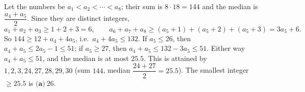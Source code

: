 Let the numbers be $a_1<a_2<\cdots<a_8$; their sum is $8\cdot18=144$ and the median is $\dfrac{a_4+a_5}{2}$. Since they are distinct integers,
\[
a_1+a_2+a_3\ge1+2+3=6,\qquad a_6+a_7+a_8\ge(a_5+1)+(a_5+2)+(a_5+3)=3a_5+6 .
\]
So $144\ge12+a_4+4a_5$, i.e.\ $a_4+4a_5\le132$. If $a_5\le26$, then $a_4+a_5\le2a_5-1\le51$; if $a_5\ge27$, then $a_4+a_5\le132-3a_5\le51$. Either way $a_4+a_5\le51$, and the median is at most $25.5$. This is attained by $1,2,3,24,27,28,29,30$ (sum $144$, median $\dfrac{24+27}{2}=25.5$). The smallest integer $\ge25.5$ is $\boxed{\textbf{(a)}\ 26}$.
